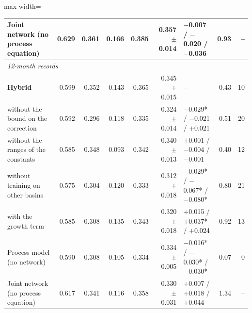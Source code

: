 \begin{table}[tbp]
\begin{adjustbox}{max width=\textwidth}
\begin{tabular}{lrrrrrlrr}
Joint network (no process equation) & 0.629 & 0.361 & 0.166 & 0.385 & 0.357 $\pm$ 0.014 & $-$0.007 / $-$0.020 / $-$0.036 & 0.93 & -- \\
\midrule
\multicolumn{9}{l}{\textit{12-month records}} \\
\textbf{Hybrid} & 0.599 & 0.352 & 0.143 & 0.365 & 0.345 $\pm$ 0.015 & -- & 0.43 & 10 \\
\quad without the bound on the correction & 0.592 & 0.296 & 0.118 & 0.335 & 0.324 $\pm$ 0.014 & $-$0.029* / $-$0.021 / $+$0.021 & 0.51 & 20 \\
\quad without the ranges of the constants & 0.585 & 0.348 & 0.093 & 0.342 & 0.340 $\pm$ 0.013 & $+$0.001 / $-$0.004 / $-$0.001 & 0.40 & 12 \\
\quad without training on other basins & 0.575 & 0.304 & 0.120 & 0.333 & 0.312 $\pm$ 0.018 & $-$0.029* / $-$0.067* / $-$0.080* & 0.80 & 21 \\
\quad with the growth term & 0.585 & 0.308 & 0.135 & 0.343 & 0.320 $\pm$ 0.018 & $+$0.015 / $+$0.037* / $+$0.024 & 0.92 & 13 \\
\midrule
Process model (no network) & 0.590 & 0.308 & 0.105 & 0.334 & 0.334 $\pm$ 0.005 & $-$0.016* / $-$0.030* / $-$0.030* & 0.07 & 0 \\
Joint network (no process equation) & 0.617 & 0.341 & 0.116 & 0.358 & 0.330 $\pm$ 0.031 & $+$0.007 / $+$0.018 / $+$0.044 & 1.34 & -- \\
\bottomrule
\end{tabular}
\end{adjustbox}
\end{table}
